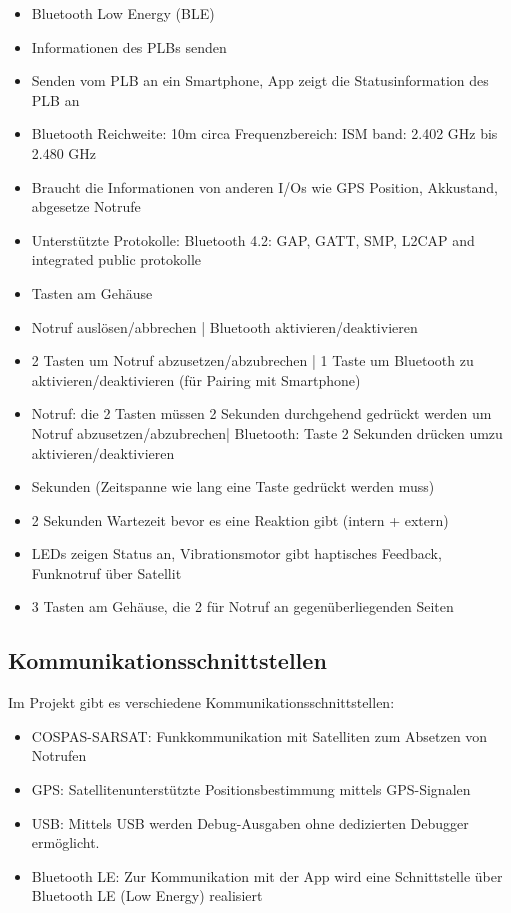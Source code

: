\begin{itemize}
	\item Bluetooth Low Energy (BLE)
	\item Informationen des PLBs senden
	\item Senden vom PLB an ein Smartphone, App zeigt die Statusinformation des PLB an
	\item Bluetooth Reichweite: 10m circa Frequenzbereich: ISM band: 2.402 GHz bis 2.480 GHz
	\item Braucht die Informationen von anderen I/Os wie GPS Position, Akkustand, abgesetze Notrufe
	\item Unterstützte Protokolle: Bluetooth 4.2: GAP, GATT, SMP, L2CAP and integrated public protokolle
\end{itemize}

\begin{itemize}
	\item Tasten am Gehäuse
	\item Notruf auslösen/abbrechen | Bluetooth aktivieren/deaktivieren
	\item 2 Tasten um Notruf abzusetzen/abzubrechen | 1 Taste um Bluetooth zu aktivieren/deaktivieren (für Pairing mit Smartphone) 
	\item  Notruf: die 2 Tasten müssen 2 Sekunden durchgehend gedrückt werden um Notruf abzusetzen/abzubrechen| Bluetooth: Taste 2 Sekunden drücken umzu aktivieren/deaktivieren 
	\item Sekunden (Zeitspanne wie lang eine Taste gedrückt werden muss) 
	\item  2 Sekunden Wartezeit bevor es eine Reaktion gibt (intern + extern) 
	\item  LEDs zeigen Status an, Vibrationsmotor gibt haptisches Feedback, Funknotruf über Satellit 
	\item  3 Tasten am Gehäuse, die 2 für Notruf an gegenüberliegenden Seiten 
\end{itemize}


\subsection{Kommunikationsschnittstellen}

Im Projekt gibt es verschiedene Kommunikationsschnittstellen:
\begin{itemize}
	\item COSPAS-SARSAT: Funkkommunikation mit Satelliten zum Absetzen von Notrufen
	\item GPS: Satellitenunterstützte Positionsbestimmung mittels GPS-Signalen
	\item USB: Mittels USB werden Debug-Ausgaben ohne dedizierten Debugger ermöglicht.
	\item Bluetooth LE: Zur Kommunikation mit der App wird eine Schnittstelle über Bluetooth LE (Low Energy) realisiert	
\end{itemize}

